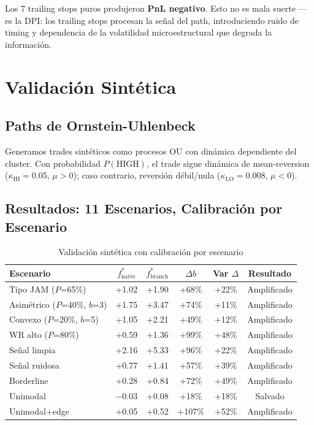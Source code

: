 \documentclass[11pt,a4paper]{article}
\begin{document}
Los 7 trailing stops puros produjeron \textbf{PnL negativo}. Esto no es mala suerte ---es la DPI: los trailing stops procesan la señal del path, introduciendo ruido de timing y dependencia de la volatilidad microestructural que degrada la información.

\section{Validación Sintética}

\subsection{Paths de Ornstein-Uhlenbeck}

Generamos trades sintéticos como procesos OU con dinámica dependiente del cluster. Con probabilidad $P(\text{HIGH})$, el trade sigue dinámica de mean-reversion ($\kappa_{\text{HI}} = 0.05$, $\mu > 0$); caso contrario, reversión débil/nula ($\kappa_{\text{LO}} = 0.008$, $\mu < 0$).

\subsection{Resultados: 11 Escenarios, Calibración por Escenario}

\begin{table}[H]
\centering
\caption{Validación sintética con calibración por escenario}
\small
\begin{tabular}{lccccc}
\toprule
Escenario & $f^*_{\text{naive}}$ & $f^*_{\text{branch}}$ & $\Delta b$ & Var $\Delta$ & Resultado \\
\midrule
Tipo JAM ($P$=65\%) & +1.02 & +1.90 & +68\% & +22\% & Amplificado \\
Asimétrico ($P$=40\%, $b$=3) & +1.75 & +3.47 & +74\% & +11\% & Amplificado \\
Convexo ($P$=20\%, $b$=5) & +1.05 & +2.21 & +49\% & +12\% & Amplificado \\
WR alto ($P$=80\%) & +0.59 & +1.36 & +99\% & +48\% & Amplificado \\
Señal limpia & +2.16 & +5.33 & +96\% & +22\% & Amplificado \\
Señal ruidosa & +0.77 & +1.41 & +57\% & +39\% & Amplificado \\
Borderline & +0.28 & +0.84 & +72\% & +49\% & Amplificado \\
\midrule
Unimodal & $-$0.03 & +0.08 & +18\% & +18\% & Salvado \\
Unimodal+edge & +0.05 & +0.52 & +107\% & +52\% & Amplificado \\
\bottomrule
\end{tabular}
\end{table}
\end{document}
